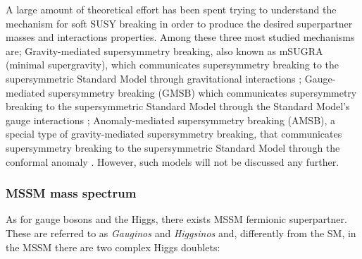 					
					
					

				A large amount of theoretical effort has been spent trying to understand the mechanism for soft SUSY breaking in order to produce the desired superpartner masses and interactions properties. Among these three most studied mechanisms are; Gravity-mediated supersymmetry breaking, also known as mSUGRA (minimal supergravity), which communicates supersymmetry breaking to the supersymmetric Standard Model through gravitational interactions \cite{PhysRevLett.49.970}; Gauge-mediated supersymmetry breaking (GMSB) which communicates supersymmetry breaking to the supersymmetric Standard Model through the Standard Model's gauge interactions \cite{ARBEY2012162}; Anomaly-mediated supersymmetry breaking (AMSB), a special type of gravity-mediated supersymmetry breaking, that communicates supersymmetry breaking to the supersymmetric Standard Model through the conformal anomaly \cite{Randall:1998uk, Giudice:1998xp}. However, such models will not be discussed any further.



			\subsubsection*{MSSM mass spectrum}

				As for gauge bosons and the Higgs, there exists MSSM fermionic superpartner. These are referred to as \emph{Gauginos} and \emph{Higgsinos} and, differently from the SM, in the MSSM there are two complex Higgs doublets: 

